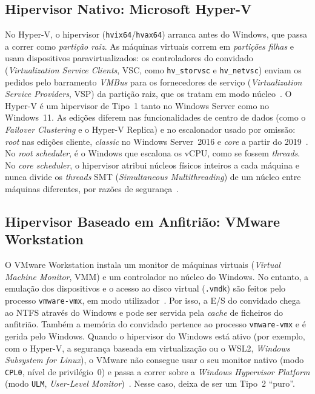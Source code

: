 \documentclass[conference]{IEEEtran}
\begin{document}
\subsection{Hipervisor Nativo: Microsoft Hyper-V}
No Hyper-V, o hipervisor (\texttt{hvix64}/\texttt{hvax64}) arranca antes do Windows, que passa a correr como \textit{partição raiz}. As máquinas virtuais correm em \textit{partições filhas} e usam dispositivos paravirtualizados: os controladores do convidado (\textit{Virtualization Service Clients}, VSC, como \texttt{hv\_storvsc} e \texttt{hv\_netvsc}) enviam os pedidos pelo barramento \textit{VMBus} para os fornecedores de serviço (\textit{Virtualization Service Providers}, VSP) da partição raiz, que os tratam em modo núcleo~\cite{b1}. O Hyper-V é um hipervisor de Tipo~1 tanto no Windows Server como no Windows~11. As edições diferem nas funcionalidades de centro de dados (como o \textit{Failover Clustering} e o Hyper-V Replica) e no escalonador usado por omissão: \textit{root} nas edições cliente, \textit{classic} no Windows Server~2016 e \textit{core} a partir do 2019~\cite{b11}. No \textit{root scheduler}, é o Windows que escalona os vCPU, como se fossem \textit{threads}. No \textit{core scheduler}, o hipervisor atribui núcleos físicos inteiros a cada máquina e nunca divide os \textit{threads} SMT (\textit{Simultaneous Multithreading}) de um núcleo entre máquinas diferentes, por razões de segurança~\cite{b11}.

\subsection{Hipervisor Baseado em Anfitrião: VMware Workstation}
O VMware Workstation instala um monitor de máquinas virtuais (\textit{Virtual Machine Monitor}, VMM) e um controlador no núcleo do Windows. No entanto, a emulação dos dispositivos e o acesso ao disco virtual (\texttt{.vmdk}) são feitos pelo processo \texttt{vmware-vmx}, em modo utilizador~\cite{b2,b9}. Por isso, a E/S do convidado chega ao NTFS através do Windows e pode ser servida pela \textit{cache} de ficheiros do anfitrião. Também a memória do convidado pertence ao processo \texttt{vmware-vmx} e é gerida pelo Windows. Quando o hipervisor do Windows está ativo (por exemplo, com o Hyper-V, a segurança baseada em virtualização ou o WSL2, \textit{Windows Subsystem for Linux}), o VMware não consegue usar o seu monitor nativo (modo \texttt{CPL0}, nível de privilégio~0) e passa a correr sobre a \textit{Windows Hypervisor Platform} (modo \texttt{ULM}, \textit{User-Level Monitor})~\cite{b12}. Nesse caso, deixa de ser um Tipo~2 ``puro''.
\end{document}
